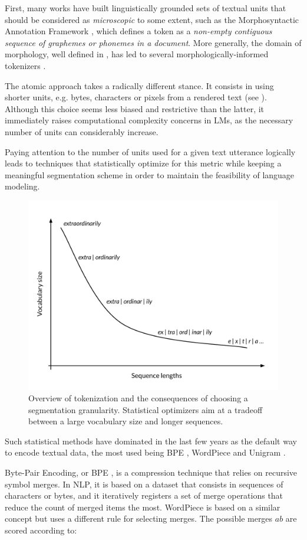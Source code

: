 First, many works have built linguistically grounded sets of textual units that should be considered as \textit{microscopic} to some extent, such as the Morphosyntactic Annotation Framework \citep{clement_maf}, which defines a token as a \textit{non-empty contiguous sequence of graphemes or phonemes in a document}. More generally, the domain of morphology, well defined in \citet{aronoff1993morphology}, has led to several morphologically-informed tokenizers \citep{saleva-lignos-2021-effectiveness, gronroos-etal-2018-cognate}.

The atomic approach takes a radically different stance. It consists in using shorter units, e.g. bytes, characters or pixels from a rendered text (see ). Although this choice seems less biased and restrictive than the latter, it immediately raises computational complexity concerns in LMs, as the necessary number of units can considerably increase.

Paying attention to the number of units used for a given text utterance logically leads to techniques that statistically optimize for this metric while keeping a meaningful segmentation scheme in order to maintain the feasibility of language modeling. 

\begin{figure}[ht]
    \centering
    \includegraphics[width=0.5\linewidth]{sources/related_works/imgs/token_graph.pdf}
    \caption{Overview of tokenization and the consequences of choosing a segmentation granularity. Statistical optimizers aim at a tradeoff between a large vocabulary size and longer sequences.}
    \label{fig:token_graph}
\end{figure}

Such statistical methods have dominated in the last few years as the default way to encode textual data, the most used being BPE \citep{sennrich-etal-2016-neural}, WordPiece \citep{wu2016google} and Unigram \citep{kudo-2018-subword}.

Byte-Pair Encoding, or BPE \citep{Gage1994bpe}, is a compression technique that relies on recursive symbol merges. In NLP, it is based on a dataset that consists in sequences of characters or bytes, and it iteratively registers a set of merge operations that reduce the count of merged items the most. WordPiece \citep{wu2016google} is based on a similar concept but uses a different rule for selecting merges. The possible merges $ab$ are scored according to:

